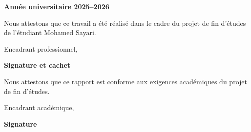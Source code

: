 \begin{center}
\textbf{Année universitaire 2025--2026}
\end{center}
\restoregeometry

\newpage
\thispagestyle{empty}
\null

\newpage
\thispagestyle{empty}

\begin{center}
    \begin{minipage}[l]{1\columnwidth}
        \begin{tcolorbox}[colback=white,boxrule=5pt,arc=10pt,height=105mm]
            \vspace{2cm}
            \large Nous attestons que ce travail a été réalisé dans le cadre du projet de fin d'études de l'étudiant Mohamed Sayari.
            \vspace{1mm}
            \begin{center}
                \Large
                Encadrant professionnel, \textbf{\@proFramerName}
            \end{center}
            \vspace{5mm}
            \begin{flushright}
                \textbf{\large Signature et cachet}
            \end{flushright}
        \end{tcolorbox}
    \end{minipage}
    
    \vspace{2cm}
    
    \begin{minipage}[l]{1\columnwidth}
        \begin{tcolorbox}[colback=white,boxrule=5pt,arc=10pt,height=105mm]
            \vspace{2cm}
            \large Nous attestons que ce rapport est conforme aux exigences académiques du projet de fin d'études.
            \vspace{1mm}
            \begin{center}
                \Large
                Encadrant académique, \textbf{\@academicFramerName}
            \end{center}
            \vspace{5mm}
            \begin{flushright}
                \textbf{\large Signature}
            \end{flushright}
        \end{tcolorbox}
    \end{minipage}
\end{center}

